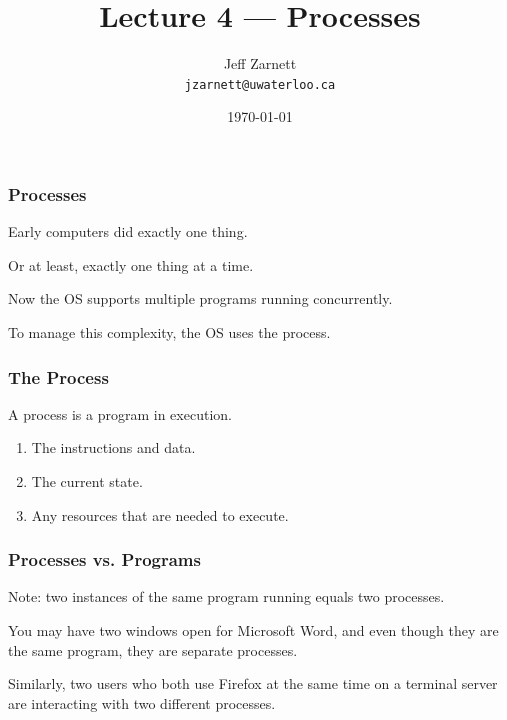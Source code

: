 

\title{Lecture 4 --- Processes }

\author{Jeff Zarnett \\ \small \texttt{jzarnett@uwaterloo.ca}}
\date{\today}




\begin{frame}
	\titlepage

\end{frame}

\begin{frame}
	\frametitle{Processes}


	Early computers did exactly one thing.

	Or at least, exactly one thing at a time.

	Now the OS supports multiple programs running concurrently.

	To manage this complexity, the OS uses the \alert{process}.

\end{frame}

\begin{frame}
	\frametitle{The Process}

	A process is a program in execution.

	\begin{enumerate}
		\item The instructions and data.
		\item The current state.
		\item Any resources that are needed to execute.
	\end{enumerate}

\end{frame}


\begin{frame}
	\frametitle{Processes vs. Programs}

	Note: two instances of the same program running equals two processes.

	You may have two windows open for Microsoft Word, and even though they are the same program, they are separate processes.


	Similarly, two users who both use Firefox at the same time on a terminal server are interacting with two different processes.

\end{frame}


